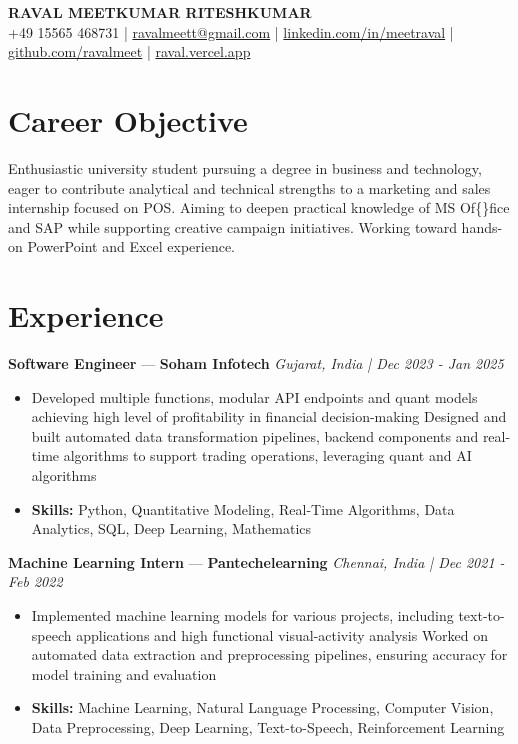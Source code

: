 \documentclass[a4paper,10pt]{article}
\begin{document}
\begin{center}
  {\Large\bfseries RAVAL MEETKUMAR RITESHKUMAR}\\[2pt]
  {\small +49 15565 468731 \;|\; \href{mailto:ravalmeett@gmail.com}{ravalmeett@gmail.com} \;|\; \href{https://www.linkedin.com/in/meetraval/}{linkedin.com/in/meetraval} \;|\; \href{https://github.com/ravalmeet}{github.com/ravalmeet} \;|\; \href{https://raval.vercel.app/}{raval.vercel.app}}
\end{center}
\vspace{-3pt}

\section*{Career Objective}
Enthusiastic university student pursuing a degree in business and technology, eager to contribute analytical and technical strengths to a marketing and sales internship focused on POS. Aiming to deepen practical knowledge of MS Of\{\}fice and SAP while supporting creative campaign initiatives. Working toward hands-on PowerPoint and Excel experience.\par

\section*{Experience}
\textbf{Software Engineer} — \textbf{Soham Infotech} \hfill \textit{Gujarat, India \;|\; Dec 2023 - Jan 2025}\par
\vspace{1pt}
\begin{itemize}
  \item Developed multiple functions, modular API endpoints and quant models achieving high level of profitability in financial decision-making Designed and built automated data transformation pipelines, backend components and real-time algorithms to support trading operations, leveraging quant and AI algorithms
  \item \textbf{Skills:} Python, Quantitative Modeling, Real-Time Algorithms, Data Analytics, SQL, Deep Learning, Mathematics
\end{itemize}
\vspace{3pt}
\textbf{Machine Learning Intern} — \textbf{Pantechelearning} \hfill \textit{Chennai, India \;|\; Dec 2021 - Feb 2022}\par
\vspace{1pt}
\begin{itemize}
  \item Implemented machine learning models for various projects, including text-to-speech applications and high functional visual-activity analysis Worked on automated data extraction and preprocessing pipelines, ensuring accuracy for model training and evaluation
  \item \textbf{Skills:} Machine Learning, Natural Language Processing, Computer Vision, Data Preprocessing, Deep Learning, Text-to-Speech, Reinforcement Learning
\end{itemize}
\end{document}
